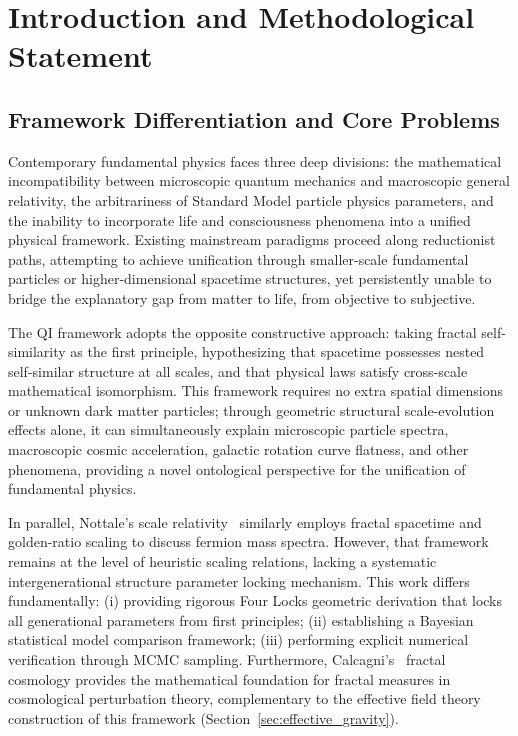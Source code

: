 \documentclass[12pt,a4paper,twocolumn]{article}
\begin{document}
\section{Introduction and Methodological Statement}

\subsection{Framework Differentiation and Core Problems}
Contemporary fundamental physics faces three deep divisions: the mathematical incompatibility between microscopic quantum mechanics and macroscopic general relativity, the arbitrariness of Standard Model particle physics parameters, and the inability to incorporate life and consciousness phenomena into a unified physical framework. Existing mainstream paradigms proceed along reductionist paths, attempting to achieve unification through smaller-scale fundamental particles or higher-dimensional spacetime structures, yet persistently unable to bridge the explanatory gap from matter to life, from objective to subjective.

The QI framework adopts the opposite constructive approach: taking fractal self-similarity as the first principle, hypothesizing that spacetime possesses nested self-similar structure at all scales, and that physical laws satisfy cross-scale mathematical isomorphism. This framework requires no extra spatial dimensions or unknown dark matter particles; through geometric structural scale-evolution effects alone, it can simultaneously explain microscopic particle spectra, macroscopic cosmic acceleration, galactic rotation curve flatness, and other phenomena, providing a novel ontological perspective for the unification of fundamental physics.

In parallel, Nottale's scale relativity~\cite{Nottale1993, Nottale2011} similarly employs fractal spacetime and golden-ratio scaling to discuss fermion mass spectra. However, that framework remains at the level of heuristic scaling relations, lacking a systematic intergenerational structure parameter locking mechanism. This work differs fundamentally: (i) providing rigorous Four Locks geometric derivation that locks all generational parameters from first principles; (ii) establishing a Bayesian statistical model comparison framework; (iii) performing explicit numerical verification through MCMC sampling. Furthermore, Calcagni's~\cite{Calcagni2010} fractal cosmology provides the mathematical foundation for fractal measures in cosmological perturbation theory, complementary to the effective field theory construction of this framework (Section~\ref{sec:effective_gravity}).
\end{document}
